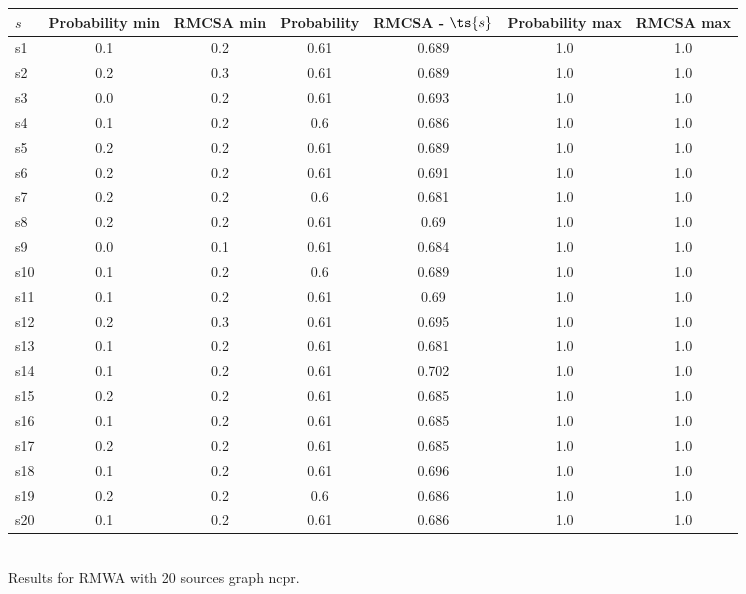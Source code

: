 \documentclass{article}
\begin{document}
\noindent\begin{tabular}{|l|c|c|c|c|c|c|}
\hline
$s$& Probability min & RMCSA min & Probability & RMCSA - $\ts{s}$ & Probability max & RMCSA max\\
\hline
s1 &0.1 & 0.2 & 0.61 & 0.689 & 1.0 & 1.0\\
\hline
s2 &0.2 & 0.3 & 0.61 & 0.689 & 1.0 & 1.0\\
\hline
s3 &0.0 & 0.2 & 0.61 & 0.693 & 1.0 & 1.0\\
\hline
s4 &0.1 & 0.2 & 0.6 & 0.686 & 1.0 & 1.0\\
\hline
s5 &0.2 & 0.2 & 0.61 & 0.689 & 1.0 & 1.0\\
\hline
s6 &0.2 & 0.2 & 0.61 & 0.691 & 1.0 & 1.0\\
\hline
s7 &0.2 & 0.2 & 0.6 & 0.681 & 1.0 & 1.0\\
\hline
s8 &0.2 & 0.2 & 0.61 & 0.69 & 1.0 & 1.0\\
\hline
s9 &0.0 & 0.1 & 0.61 & 0.684 & 1.0 & 1.0\\
\hline
s10 &0.1 & 0.2 & 0.6 & 0.689 & 1.0 & 1.0\\
\hline
s11 &0.1 & 0.2 & 0.61 & 0.69 & 1.0 & 1.0\\
\hline
s12 &0.2 & 0.3 & 0.61 & 0.695 & 1.0 & 1.0\\
\hline
s13 &0.1 & 0.2 & 0.61 & 0.681 & 1.0 & 1.0\\
\hline
s14 &0.1 & 0.2 & 0.61 & 0.702 & 1.0 & 1.0\\
\hline
s15 &0.2 & 0.2 & 0.61 & 0.685 & 1.0 & 1.0\\
\hline
s16 &0.1 & 0.2 & 0.61 & 0.685 & 1.0 & 1.0\\
\hline
s17 &0.2 & 0.2 & 0.61 & 0.685 & 1.0 & 1.0\\
\hline
s18 &0.1 & 0.2 & 0.61 & 0.696 & 1.0 & 1.0\\
\hline
s19 &0.2 & 0.2 & 0.6 & 0.686 & 1.0 & 1.0\\
\hline
s20 &0.1 & 0.2 & 0.61 & 0.686 & 1.0 & 1.0\\
\hline
\end{tabular}\\

\noindent Results for RMWA with 20 sources graph ncpr.
\end{document}
